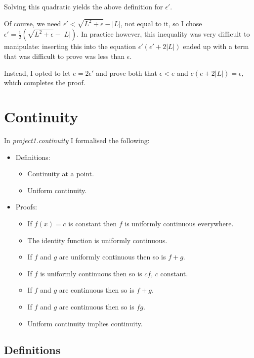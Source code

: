 \documentclass[a4paper, twoside, 11pt]{article}
\theoremstyle{definition}
\theoremstyle{plain}
\theoremstyle{remark}
\begin{document}
Solving this quadratic yields the above definition for $\epsilon'$.

Of course, we need $\epsilon' < \sqrt{L^{2} + \epsilon} - \left\lvert L \right\rvert$, not equal to it, so I chose $\epsilon' = \frac{1}{2}\left( \sqrt{L^{2} + \epsilon} - \left\lvert L \right\rvert \right)$. In practice however, this inequality was very difficult to manipulate: inserting this into the equation $\epsilon'(\epsilon' + 2|L|)$ ended up with a term that was difficult to prove was less than $\epsilon$.

Instead, I opted to let $e = 2\epsilon'$ and prove both that $\epsilon < e$ and $e(e + 2|L|) = \epsilon$, which completes the proof.


\section{Continuity}

In \emph{project1.continuity} I formalised the following:
\begin{itemize}
    \item Definitions:
    \begin{itemize}
        \item Continuity at a point.
        \item Uniform continuity.
    \end{itemize}
    \item Proofs:
    \begin{itemize}
        \item If $f(x) = c$ is constant then $f$ is uniformly continuous everywhere.
        \item The identity function is uniformly continuous.
        \item If $f$ and $g$ are uniformly continuous then so is $f + g$.
        \item If $f$ is uniformly continuous then so is $cf$, $c$ constant.
        \item If $f$ and $g$ are continuous then so is $f + g$.
        \item If $f$ and $g$ are continuous then so is $fg$.
        \item Uniform continuity implies continuity.
    \end{itemize}
\end{itemize}

\subsection*{Definitions}
\end{document}
